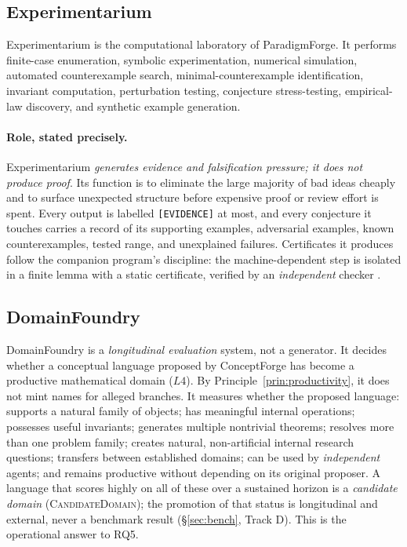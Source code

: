 \documentclass[11pt]{article}
\theoremstyle{definition}
\theoremstyle{remark}
\newcommand{\state}[1]{\texttt{[#1]}}
\newcommand{\ntype}[1]{\textsc{#1}}
\newcommand{\PF}{ParadigmForge}
\begin{document}
\subsection{Experimentarium}
\label{sec:experimentarium}

Experimentarium is the computational laboratory of \PF{}. It performs finite-case enumeration,
symbolic experimentation, numerical simulation, automated counterexample search, minimal-counterexample
identification, invariant computation, perturbation testing, conjecture stress-testing, empirical-law
discovery, and synthetic example generation.

\paragraph{Role, stated precisely.} Experimentarium \emph{generates evidence and falsification
pressure; it does not produce proof}. Its function is to eliminate the large majority of bad ideas
cheaply and to surface unexpected structure before expensive proof or review effort is spent. Every
output is labelled \state{EVIDENCE} at most, and every conjecture it touches carries a record of its
supporting examples, adversarial examples, known counterexamples, tested range, and unexplained
failures. Certificates it produces follow the companion program's discipline: the machine-dependent
step is isolated in a finite lemma with a static certificate, verified by an \emph{independent}
checker \citep{lucius2026bourbaki,hales2017,heule2016}.

\subsection{DomainFoundry}
\label{sec:domainfoundry}

DomainFoundry is a \emph{longitudinal evaluation} system, not a generator. It decides whether a
conceptual language proposed by ConceptForge has become a productive mathematical domain ($L4$). By
Principle~\ref{prin:productivity}, it does not mint names for alleged branches. It measures whether
the proposed language: supports a natural family of objects; has meaningful internal operations;
possesses useful invariants; generates multiple nontrivial theorems; resolves more than one problem
family; creates natural, non-artificial internal research questions; transfers between established
domains; can be used by \emph{independent} agents; and remains productive without depending on its
original proposer. A language that scores highly on all of these over a sustained horizon is a
\emph{candidate domain} (\ntype{CandidateDomain}); the promotion of that status is longitudinal and
external, never a benchmark result (\S\ref{sec:bench}, Track D). This is the operational answer to
RQ5.
\end{document}
